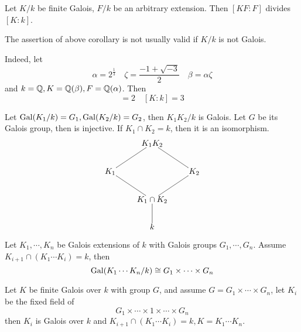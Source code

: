   \begin{cor}
    Let $K/k$ be finite Galois, $F/k$ be an arbitrary extension. Then $[KF:F]$ divides $[K:k]$.
  \end{cor}
  \begin{warn}
    The assertion of above corollary is not usually valid if $K/k$ is not Galois.

    Indeed, let
    \begin{equation*}
      \alpha=2^{\frac{1}{3}}\quad\zeta=\frac{-1+\sqrt{-3}}{2}\quad\beta=\alpha\zeta
    \end{equation*}
    and $k={\mathbb Q},K={\mathbb Q}(\beta),F={\mathbb Q}(\alpha)$. Then
    \begin{equation*}
      [KF:F]=2\quad [K:k]=3
    \end{equation*}
  \end{warn}

  \begin{thm}
    Let $\operatorname{Gal}(K_1/k)=G_1, \operatorname{Gal}(K_2/k)=G_2$, then $K_1K_2/k$ is Galois. Let $G$ be its Galois group, then
    is injective. If $K_1\cap K_2=k$, then it is an isomorphism.
                 \begin{displaymath}
                   \xymatrix@1{
                      & K_1K_2\ar@{-}[dr] &\\
                      K_1\ar@{-}[ur] && K_2\ar@{-}[dl] \\
                      & K_1\cap K_2\ar@{-}[ul] &\\
                      & k\ar@{-}[u] &           }
                 \end{displaymath}
  \end{thm}

  \begin{cor}
    Let $K_1,\cdots,K_n$ be Galois extensions of $k$ with Galois groups $G_1,\cdots, G_n$. Assume $K_{i+1}\cap(K_1\cdots K_i)=k$, then
    \begin{equation*}
      \operatorname{Gal}(K_1\cdots K_n/k)\cong G_1\times\cdots\times G_n
    \end{equation*}
  \end{cor}

  \begin{cor}
    Let $K$ be finite Galois over $k$ with group $G$, and assume $G=G_1\times\cdots\times G_n$, let $K_i$ be the fixed field of
    \begin{equation*}
      G_1\times\cdots\times 1 \times\cdots\times G_n
    \end{equation*}
    then $K_i$ is Galois over $k$ and $K_{i+1}\cap(K_1\cdots K_i)=k, K=K_1\cdots K_n$.
  \end{cor}

